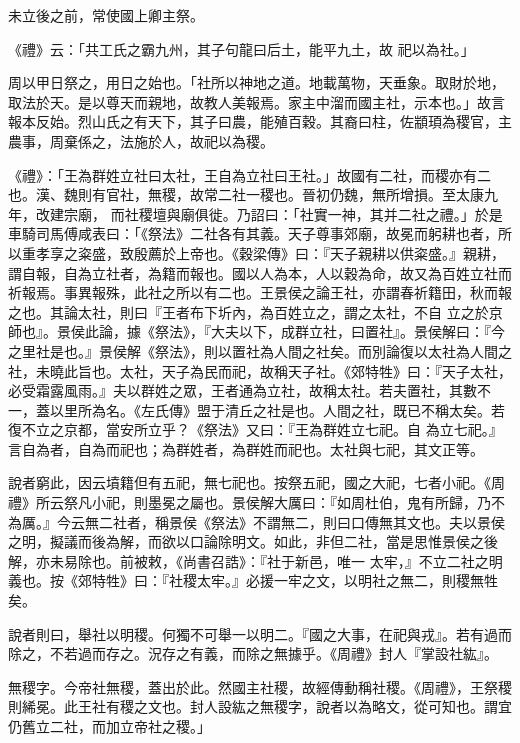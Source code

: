 \begin{pinyinscope}
 未立後之前，常使國上卿主祭。



 《禮》云：「共工氏之霸九州，其子句龍曰后土，能平九土，故
 祀以為社。」



 周以甲日祭之，用日之始也。「社所以神地之道。地載萬物，天垂象。取財於地，取法於天。是以尊天而親地，故教人美報焉。家主中溜而國主社，示本也。」故言報本反始。烈山氏之有天下，其子曰農，能殖百穀。其裔曰柱，佐顓頊為稷官，主農事，周棄係之，法施於人，故祀以為稷。



 《禮》：「王為群姓立社曰太社，王自為立社曰王社。」故國有二社，而稷亦有二也。漢、魏則有官社，無稷，故常二社一稷也。晉初仍魏，無所增損。至太康九年，改建宗廟，
 而社稷壇與廟俱徙。乃詔曰：「社實一神，其并二社之禮。」於是車騎司馬傅咸表曰：「《祭法》二社各有其義。天子尊事郊廟，故冕而躬耕也者，所以重孝享之粢盛，致殷薦於上帝也。《穀梁傳》曰：『天子親耕以供粢盛。』親耕，謂自報，自為立社者，為籍而報也。國以人為本，人以穀為命，故又為百姓立社而祈報焉。事異報殊，此社之所以有二也。王景侯之論王社，亦謂春祈籍田，秋而報之也。其論太社，則曰『王者布下圻內，為百姓立之，謂之太社，不自
 立之於京師也』。景侯此論，據《祭法》，『大夫以下，成群立社，曰置社』。景侯解曰：『今之里社是也。』景侯解《祭法》，則以置社為人間之社矣。而別論復以太社為人間之社，未曉此旨也。太社，天子為民而祀，故稱天子社。《郊特牲》曰：『天子太社，必受霜露風雨。』夫以群姓之眾，王者通為立社，故稱太社。若夫置社，其數不一，蓋以里所為名。《左氏傳》盟于清丘之社是也。人間之社，既已不稱太矣。若復不立之京都，當安所立乎？《祭法》又曰：『王為群姓立七祀。自
 為立七祀。』言自為者，自為而祀也；為群姓者，為群姓而祀也。太社與七祀，其文正等。



 說者窮此，因云墳籍但有五祀，無七祀也。按祭五祀，國之大祀，七者小祀。《周禮》所云祭凡小祀，則墨冕之屬也。景侯解大厲曰：『如周杜伯，鬼有所歸，乃不為厲。』今云無二社者，稱景侯《祭法》不謂無二，則曰口傳無其文也。夫以景侯之明，擬議而後為解，而欲以口論除明文。如此，非但二社，當是思惟景侯之後解，亦未易除也。前被敕，《尚書召誥》：『社于新邑，唯一
 太牢，』不立二社之明義也。按《郊特牲》曰：『社稷太牢。』必援一牢之文，以明社之無二，則稷無牲矣。



 說者則曰，舉社以明稷。何獨不可舉一以明二。『國之大事，在祀與戎』。若有過而除之，不若過而存之。況存之有義，而除之無據乎。《周禮》封人『掌設社紘』。



 無稷字。今帝社無稷，蓋出於此。然國主社稷，故經傳動稱社稷。《周禮》，王祭稷則絺冕。此王社有稷之文也。封人設紘之無稷字，說者以為略文，從可知也。謂宜仍舊立二社，而加立帝社之稷。」




\end{pinyinscope}
